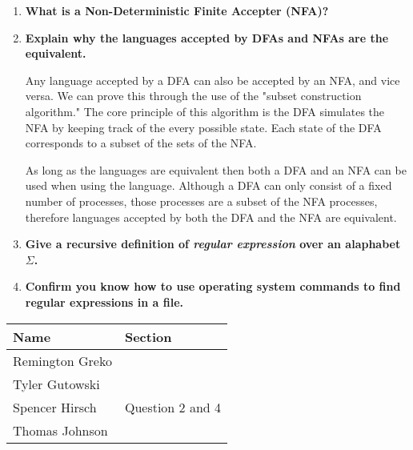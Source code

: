 \documentclass{article}
\begin{document}
\begin{enumerate}
    \medskip

    \item \textbf{What is a Non-Deterministic Finite Accepter (NFA)?}
    
    \medskip


    \medskip

    \item \textbf{Explain why the languages accepted by DFAs and NFAs are the equivalent.}
    
    \medskip

    \-\hspace{0.5cm} Any language accepted by a DFA can also be accepted by an NFA,
     and vice versa. We can prove this through the use of the "subset construction
     algorithm." The core principle of this algorithm is the DFA simulates the NFA
     by keeping track of the every possible state. Each state of the DFA corresponds
     to a subset of the sets of the NFA.

     \-\hspace{0.5cm} As long as the languages are equivalent then both a DFA and an 
     NFA can be used when using the language. Although a DFA can only consist of a 
     fixed number of processes, those processes are a subset of the NFA processes,
     therefore languages accepted by both the DFA and the NFA are equivalent.

    \medskip

    \item \textbf{Give a recursive definition of \textit{regular expression} over
            an alaphabet $\Sigma$.}

    \medskip


    \medskip

    \item \textbf{Confirm you know how to use operating system commands to find
            regular expressions in a file.}

    \medskip


    \medskip
\end{enumerate}

\pagebreak

\begin{center}
    \begin{tabular}{|p{3cm}|p{6cm}|}
        \hline
        \textbf{Name} & \textbf{Section} \\
        \hline
        Remington Greko &  \\
        \hline
        Tyler Gutowski &  \\
        \hline
        Spencer Hirsch &  Question 2 and 4\\
        \hline
        Thomas Johnson &  \\
        \hline
    \end{tabular}
\end{center}
\end{document}
